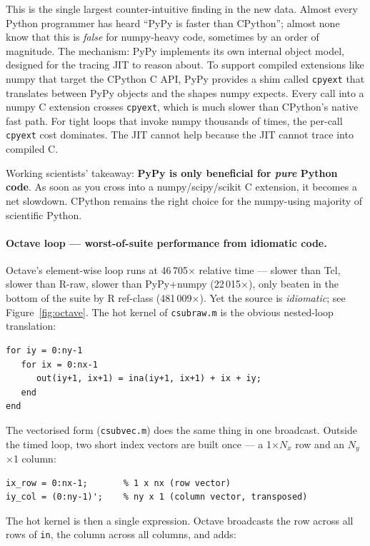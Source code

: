 \documentclass[11pt,a4paper]{article}
\begin{document}
\noindent
This is the single largest counter-intuitive finding in the new
data. Almost every Python programmer has heard ``PyPy is faster
than CPython''; almost none know that this is \emph{false} for
numpy-heavy code, sometimes by an order of magnitude. The
mechanism: PyPy implements its own internal object model, designed
for the tracing JIT to reason about. To support compiled extensions
like numpy that target the CPython C API, PyPy provides a shim
called \texttt{cpyext} that translates between PyPy objects and the
shapes numpy expects. Every call into a numpy C extension crosses
\texttt{cpyext}, which is much slower than CPython's native fast
path. For tight loops that invoke numpy thousands of times, the
per-call \texttt{cpyext} cost dominates. The JIT cannot help because
the JIT cannot trace into compiled C.

Working scientists' takeaway: \textbf{PyPy is only beneficial for
\emph{pure} Python code}. As soon as you cross into a
numpy/scipy/scikit C extension, it becomes a net slowdown. CPython
remains the right choice for the numpy-using majority of scientific
Python.

\paragraph{Octave loop --- worst-of-suite performance from idiomatic code.}
Octave's element-wise loop runs at 46\,705$\times$ relative time ---
slower than Tcl, slower than R-raw, slower than PyPy+numpy
(22\,015$\times$), only beaten in the bottom of the suite by R
ref-class (481\,009$\times$). Yet the source is \emph{idiomatic};
see Figure~\ref{fig:octave}. The hot kernel of \texttt{csubraw.m} is
the obvious nested-loop translation:

\begin{lstlisting}
for iy = 0:ny-1
   for ix = 0:nx-1
      out(iy+1, ix+1) = ina(iy+1, ix+1) + ix + iy;
   end
end
\end{lstlisting}

\noindent
The vectorised form (\texttt{csubvec.m}) does the same thing in one
broadcast. Outside the timed loop, two short index vectors are built
once --- a 1$\times$$N_x$ row and an $N_y$$\times$1 column:

\begin{lstlisting}
ix_row = 0:nx-1;       % 1 x nx (row vector)
iy_col = (0:ny-1)';    % ny x 1 (column vector, transposed)
\end{lstlisting}

\noindent
The hot kernel is then a single expression. Octave broadcasts the
row across all rows of \texttt{in}, the column across all columns,
and adds:
\end{document}

